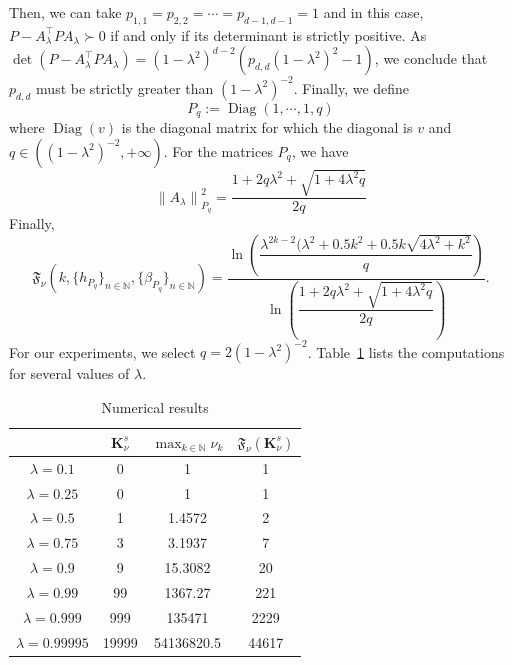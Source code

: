 \documentclass{article}
\def\norm#1{\left\|#1\right\|}
\def\nn{\mathbb N}
\def\bigks{\mathbf{K}^s}
\def\red#1{#1}
\def\blue#1{#1}
\begin{document}
		Then, we can take $p_{1,1}=p_{2,2}=\cdots=p_{d-1,d-1}=1$ and in this case, $P-A_\lambda^\intercal P A_\lambda \succ 0$ if and only if its determinant is strictly positive. As $\det(P-A_\lambda^\intercal P A_\lambda)=(1-\lambda^2)^{d-2}(p_{d,d}(1-\lambda^2)^2-1)$, we conclude that $p_{d,d}$ must be strictly greater than $(1-\lambda^2)^{-2}$. Finally, we define \[P_q:=\operatorname{Diag}(1,\cdots,1,q)\] where $\operatorname{Diag}(v)$ is the diagonal matrix for which the diagonal is $v$ and $q\in \left((1-\lambda^2)^{-2},+\infty\right)$. For \red{the} matrices $P_q$, we have
		\[
		\norm{A_\lambda}_{P_q}^2=\dfrac{1+2q\lambda^2+\sqrt{1+4\lambda^2 q}}{2q}
		\]  
		Finally,
		\[
		\mathfrak{F}_{\blue{\nu}}(k,\{h_{P_q}\}_{n\in\nn},\{\beta_{P_q}\}_{n\in\nn})
		=\dfrac{\ln\left(\dfrac{\lambda^{2k-2}(\lambda^2+0.5k^2+0.5k\sqrt{4\lambda^2+k^2}}{q}\right)}{\ln\left(\dfrac{1+2q\lambda^2+\sqrt{1+4\lambda^2 q}}{2q}\right)}.
		\]
		For our experiments, we \blue{select} $q=2(1-\lambda^2)^{-2}$. Table~\ref{smallbenchs} \blue{lists} the computations for several values of $\lambda$.
		\begin{center}
			\begin{table}[h!]
				\begin{center}
					\begin{tabular}{|c||c|c|c|}
						\hline
						& $\bigks_\blue{\nu}$ & $\displaystyle{\max_{k\in\nn} \blue{\nu}_k}$ & $\mathfrak{F}_{\blue{\nu}}(\bigks_{\blue{\nu}})$ \\
						\hline
						$\lambda=0.1$& 0 &1 &1\\
						\hline
						$\lambda=0.25$&0 &1 &1\\
						\hline
						$\lambda=0.5$& 1 & 1.4572 & 2\\
						\hline
						$\lambda=0.75$& 3 &3.1937 &7\\
						\hline
						$\lambda=0.9$&9 &15.3082 &20\\
						\hline
						$\lambda=0.99$&99 &1367.27 &221\\
						\hline
						$\lambda=0.999$&999 &135471  &2229\\
						\hline
						$\lambda=0.99995$&19999 &54136820.5  &44617\\
						\hline
					\end{tabular}
				\end{center}
				\caption{Numerical results}
				\label{smallbenchs}
			\end{table}
		\end{center}
\end{document}
